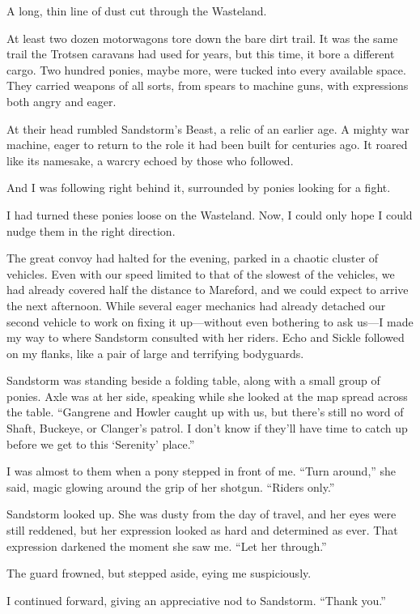 A long, thin line of dust cut through the Wasteland.

At least two dozen motorwagons tore down the bare dirt trail. It was the same trail the Trotsen caravans had used for years, but this time, it bore a different cargo. Two hundred ponies, maybe more, were tucked into every available space. They carried weapons of all sorts, from spears to machine guns, with expressions both angry and eager.

At their head rumbled Sandstorm’s Beast, a relic of an earlier age. A mighty war machine, eager to return to the role it had been built for centuries ago. It roared like its namesake, a warcry echoed by those who followed.

And I was following right behind it, surrounded by ponies looking for a fight.

I had turned these ponies loose on the Wasteland. Now, I could only hope I could nudge them in the right direction.

{\br}%
The great convoy had halted for the evening, parked in a chaotic cluster of vehicles. Even with our speed limited to that of the slowest of the vehicles, we had already covered half the distance to Mareford, and we could expect to arrive the next afternoon. While several eager mechanics had already detached our second vehicle to work on fixing it up—without even bothering to ask us—I made my way to where Sandstorm consulted with her riders. Echo and Sickle followed on my flanks, like a pair of large and terrifying bodyguards.

Sandstorm was standing beside a folding table, along with a small group of ponies. Axle was at her side, speaking while she looked at the map spread across the table. “Gangrene and Howler caught up with us, but there’s still no word of Shaft, Buckeye, or Clanger’s patrol. I don’t know if they’ll have time to catch up before we get to this ‘Serenity’ place.”

I was almost to them when a pony stepped in front of me. “Turn around,” she said, magic glowing around the grip of her shotgun. “Riders only.”

Sandstorm looked up. She was dusty from the day of travel, and her eyes were still reddened, but her expression looked as hard and determined as ever. That expression darkened the moment she saw me. “Let her through.”

The guard frowned, but stepped aside, eying me suspiciously.

I continued forward, giving an appreciative nod to Sandstorm. “Thank you.”

